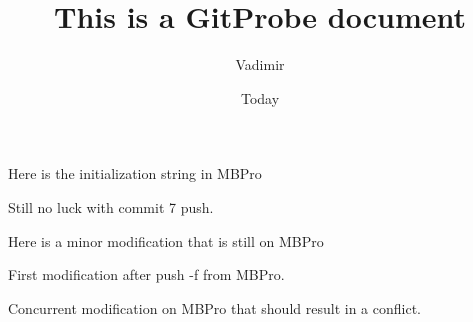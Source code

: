 \documentclass[]{article}
\begin{document}
\title{This is a GitProbe document}
\author{Vadimir}
\date{Today}
\maketitle

Here is the initialization string in MBPro

Still no luck with commit 7 push. 

Here is a minor modification that is still on MBPro

First modification after push -f  from MBPro.

Concurrent modification on MBPro that should result in a conflict.
\end{document}

